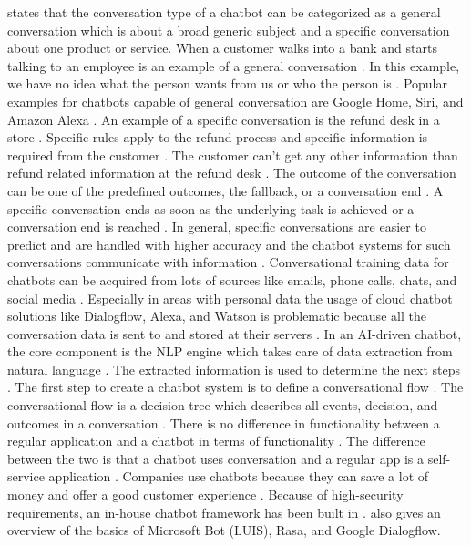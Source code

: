 \citet{singhbuilding} states that the conversation type of a chatbot can be categorized as a general conversation which is about a broad generic subject and a specific conversation about one product or service.
When a customer walks into a bank and starts talking to an employee is an example of a general conversation \cite{singhbuilding}.
In this example, we have no idea what the person wants from us or who the person is \cite{singhbuilding}.
Popular examples for chatbots capable of general conversation are Google Home, Siri, and Amazon Alexa \cite{singhbuilding}.
An example of a specific conversation is the refund desk in a store \cite{singhbuilding}. Specific rules apply to the refund process and specific information is required from the customer \cite{singhbuilding}. The customer can't get any other information than refund related information at the refund desk \cite{singhbuilding}. The outcome of the conversation can be one of the predefined outcomes, the fallback, or a conversation end \cite{singhbuilding}. 
A specific conversation ends as soon as the underlying task is achieved or a conversation end is reached \cite{singhbuilding}. 
In general, specific conversations are easier to predict and are handled with higher accuracy and the chatbot systems for such conversations 
communicate with information \cite{singhbuilding}. 
Conversational training data for chatbots can be acquired from lots of sources like emails, phone calls, chats, and social media \cite{singhbuilding}.
Especially in areas with personal data the usage of cloud chatbot solutions like Dialogflow, Alexa, and Watson is problematic because all the conversation data is sent to and stored at their servers \cite{singhbuilding}.
In an AI-driven chatbot, the core component is the NLP engine which takes care of data extraction from natural language \cite{singhbuilding}. The extracted information is used to determine the next steps \cite{singhbuilding}.
The first step to create a chatbot system is to define a conversational flow \cite{singhbuilding}.
The conversational flow is a decision tree which describes all events, decision, and outcomes in a conversation \cite{singhbuilding}.
There is no difference in functionality between a regular application and a chatbot in terms of functionality \cite{singhbuilding}. The difference between the two is that a chatbot uses conversation and a regular app is a self-service application \cite{singhbuilding}. Companies use chatbots because they can save a lot of money and offer a good customer experience \cite{singhbuilding}.
Because of high-security requirements, an in-house chatbot framework has been built in \citet{singhbuilding}.
\citet{singhbuilding} also gives an overview of the basics of Microsoft Bot (LUIS), Rasa, and Google Dialogflow.

